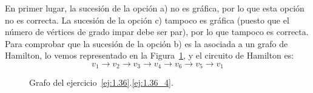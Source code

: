 \begin{ejercicio}
\begin{enumerate}
        En primer lugar, la sucesión de la opción a) no es gráfica, por lo que esta opción no es correcta. La sucesión de la opción c) tampoco es gráfica (puesto que el número de vértices de grado impar debe ser par), por lo que tampoco es correcta. Para comprobar que la sucesión de la opción b) es la asociada a un grafo de Hamilton, lo vemos representado en la Figura~\ref{fig:1.36_4}, y el circuito de Hamilton es:
        \begin{equation*}
            v_1\to v_2\to v_3\to v_4\to v_6\to v_5\to v_1
        \end{equation*}
        \begin{figure}
            \centering
            \caption{Grafo del ejercicio~\ref{ej:1.36}.\ref{ej:1.36_4}.}
            \label{fig:1.36_4}
        \end{figure}
    \end{enumerate}
\end{ejercicio}

